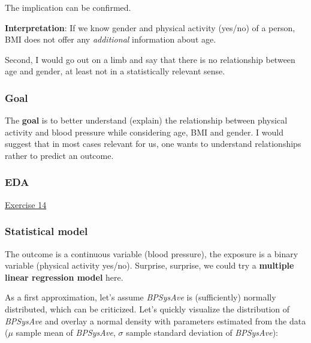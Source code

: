 \documentclass[
]{book}
\begin{document}
The implication can be confirmed.

\textbf{Interpretation}: If we know gender and physical activity (yes/no) of a person,
BMI does not offer any \emph{additional} information about age.

Second, I would go out on a limb and say that there is no relationship
between age and gender, at least not in a statistically relevant sense.

\subsubsection{Goal}\label{goal}

The \textbf{goal} is to better understand (explain) the relationship between
physical activity and blood pressure while considering age, BMI and gender.
I would suggest that in most cases relevant for us, one wants to understand
relationships rather to predict an outcome.

\subsubsection{EDA}\label{eda}

\hyperref[exercise14_multiple_regression]{Exercise 14}

\subsubsection{Statistical model}\label{statistical-model}

The outcome is a continuous variable (blood pressure), the exposure is a binary
variable (physical activity yes/no).
Surprise, surprise, we could try a \textbf{multiple linear regression model} here.

As a first approximation, let's assume \emph{BPSysAve} is (sufficiently) normally distributed,
which can be criticized. Let's quickly visualize the distribution of \emph{BPSysAve} and overlay
a normal density with parameters estimated from the data (\(\mu\) sample mean of \emph{BPSysAve},
\(\sigma\) sample standard deviation of \emph{BPSysAve}):
\end{document}
